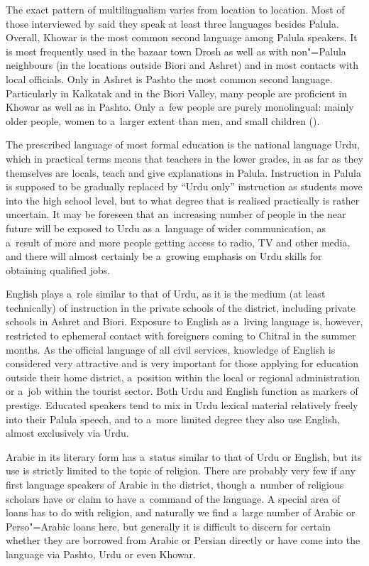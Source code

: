 The exact pattern of multilingualism varies from location to location. Most of those interviewed by \citet{decker1992a} said they speak at least three languages besides Palula. Overall, Khowar is the most common second language among Palula speakers. It is most frequently used in the bazaar town Drosh as well as with non"=Palula neighbours (in the locations outside Biori and Ashret) and in most contacts with local officials. Only in Ashret is Pashto the most common second language. Particularly in Kalkatak and in the Biori Valley, many people are proficient in Khowar as well as in Pashto. Only a~few people are purely monolingual: mainly older people, women to a~larger extent than men, and small children (\citealt{decker1992a}). 


The prescribed language of most formal education is the national language Urdu, which in practical terms means that teachers in the lower grades, in as far as they themselves are locals, teach and give explanations in Palula. Instruction in Palula is supposed to be gradually replaced by ``Urdu only'' instruction as students move into the high school level, but to what degree that is realised practically is rather uncertain. It may be foreseen that an~increasing number of people in the near future will be exposed to Urdu as a~language of wider communication, as a~result of more and more people getting access to radio, TV and other media, and there will almost certainly be a~growing emphasis on Urdu skills for obtaining qualified jobs.


English plays a~role similar to that of Urdu, as it is the medium (at least technically) of instruction in the private schools of the district, including private schools in Ashret and Biori. Exposure to English as a~living language is, however, restricted to ephemeral contact with foreigners coming to Chitral in the summer months. As the official language of all civil services, knowledge of English is considered very attractive and is very important for those applying for education outside their home district, a~position within the local or regional administration or a~job within the tourist sector. Both Urdu and English function as markers of prestige. Educated speakers tend to mix in Urdu lexical material relatively freely into their Palula speech, and to a~more limited degree they also use English, almost exclusively via Urdu. 


Arabic in its literary form has a~status similar to that of Urdu or English, but its use is strictly limited to the topic of religion. There are probably very few if any first language speakers of Arabic in the district, though a~number of religious scholars have or claim to have a~command of the language. A special area of loans has to do with religion, and naturally we find a~large number of Arabic or Perso"=Arabic loans here, but generally it is difficult to discern for certain whether they are borrowed from Arabic or Persian directly or have come into the language via Pashto, Urdu or even Khowar.


